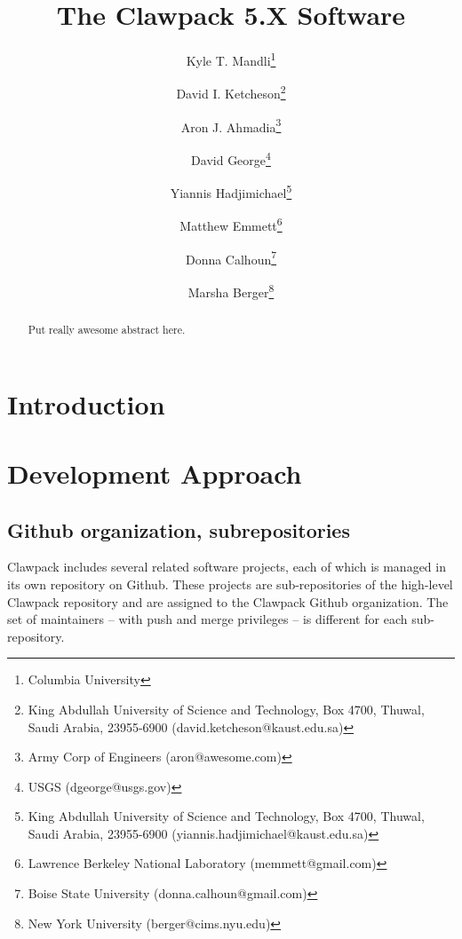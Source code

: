 \documentclass[]{siamltex}
\begin{document}
\ifpdf
{}
\else
{}
\fi

\title{The Clawpack 5.X Software}


\author{Kyle T. Mandli\thanks{
            Columbia University} \and
        David I. Ketcheson\thanks{
            King Abdullah University of Science and Technology, Box 4700, Thuwal, Saudi Arabia, 23955-6900 (\mbox{david.ketcheson@kaust.edu.sa})} \and
        Aron J. Ahmadia\thanks{
            Army Corp of Engineers (\mbox{aron@awesome.com})} \and
        David George\thanks{
            USGS (\mbox{dgeorge@usgs.gov})} \and
        Yiannis Hadjimichael\thanks{
            King Abdullah University of Science and Technology, Box 4700, Thuwal, Saudi Arabia, 23955-6900 (\mbox{yiannis.hadjimichael@kaust.edu.sa})} \and
        Matthew Emmett\thanks{
            Lawrence Berkeley National Laboratory (\mbox{memmett@gmail.com})} \and
        Donna Calhoun\thanks{
            Boise State University (\mbox{donna.calhoun@gmail.com})} \and
        Marsha Berger\thanks{
            New York University (\mbox{berger@cims.nyu.edu})}
        }

\maketitle

\begin{abstract}
    Put really awesome abstract here.
\end{abstract}

\section{Introduction}

\section{Development Approach}

\subsection{Github organization, subrepositories}
Clawpack includes several related software projects, each of which is managed in its own repository on Github.  These projects are sub-repositories of the high-level Clawpack repository and are assigned to the Clawpack Github organization.  The set of maintainers -- with push and merge privileges -- is different for each sub-repository.  
\end{document}

